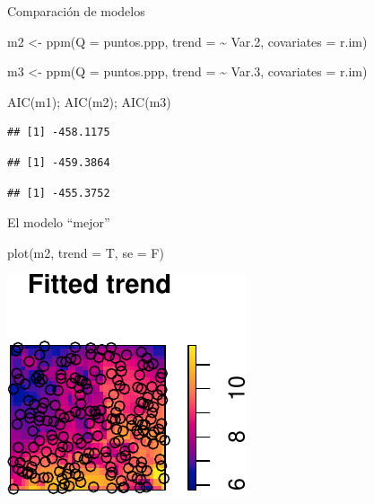 \documentclass[
  11pt,
  ignorenonframetext,
]{beamer}
\newenvironment{Shaded}{}{}
\newcommand{\AttributeTok}[1]{\textcolor[rgb]{0.49,0.56,0.16}{#1}}
\newcommand{\FloatTok}[1]{\textcolor[rgb]{0.25,0.63,0.44}{#1}}
\newcommand{\FunctionTok}[1]{\textcolor[rgb]{0.02,0.16,0.49}{#1}}
\newcommand{\NormalTok}[1]{#1}
\newcommand{\OtherTok}[1]{\textcolor[rgb]{0.00,0.44,0.13}{#1}}
\newcommand{\SpecialCharTok}[1]{\textcolor[rgb]{0.25,0.44,0.63}{#1}}
\begin{document}
\begin{frame}[fragile]{Comparación de modelos}
\protect\hypertarget{comparaciuxf3n-de-modelos}{}
\begin{Shaded}
\begin{Highlighting}[]
\NormalTok{m2 }\OtherTok{\textless{}{-}} \FunctionTok{ppm}\NormalTok{(}\AttributeTok{Q =}\NormalTok{ puntos.ppp,}
          \AttributeTok{trend =} \SpecialCharTok{\textasciitilde{}}\NormalTok{ Var}\FloatTok{.2}\NormalTok{,}
          \AttributeTok{covariates =}\NormalTok{ r.im)}

\NormalTok{m3 }\OtherTok{\textless{}{-}} \FunctionTok{ppm}\NormalTok{(}\AttributeTok{Q =}\NormalTok{ puntos.ppp,}
          \AttributeTok{trend =} \SpecialCharTok{\textasciitilde{}}\NormalTok{ Var}\FloatTok{.3}\NormalTok{,}
          \AttributeTok{covariates =}\NormalTok{ r.im)}

\FunctionTok{AIC}\NormalTok{(m1); }\FunctionTok{AIC}\NormalTok{(m2); }\FunctionTok{AIC}\NormalTok{(m3)}
\end{Highlighting}
\end{Shaded}

\begin{verbatim}
## [1] -458.1175
\end{verbatim}

\begin{verbatim}
## [1] -459.3864
\end{verbatim}

\begin{verbatim}
## [1] -455.3752
\end{verbatim}
\end{frame}

\begin{frame}[fragile]{El modelo ``mejor''}
\protect\hypertarget{el-modelo-mejor}{}
\begin{Shaded}
\begin{Highlighting}[]
\FunctionTok{plot}\NormalTok{(m2, }\AttributeTok{trend =}\NormalTok{ T, }\AttributeTok{se =}\NormalTok{ F)}
\end{Highlighting}
\end{Shaded}

\begin{center}\includegraphics{Tutorial-spatstat_files/figure-beamer/unnamed-chunk-23-1} \end{center}
\end{frame}
\end{document}
